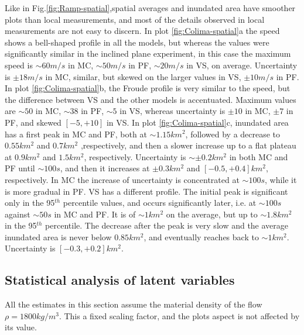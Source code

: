 \documentclass{article}
\begin{document}
Like in Fig.\ref{fig:Ramp-spatial},spatial averages and inundated area have smoother plots than local measurements, and most of the details observed in local measurements are not easy to discern. In plot \ref{fig:Colima-spatial}a the speed shows a bell-shaped profile in all the models, but whereas the values were significantly similar in the inclined plane experiment, in this case the maximum speed is $\sim 60 m/s$ in MC, $\sim 50 m/s$ in PF, $\sim 20 m/s$ in VS, on average. Uncertainty is $\pm 18 m/s$ in MC, similar, but skewed on the larger values in VS, $\pm 10 m/s$ in PF. In plot \ref{fig:Colima-spatial}b, the Froude profile is very similar to the speed, but the difference between VS and the other models is accentuated. Maximum values are $\sim 50$ in MC, $\sim 38$ in PF, $\sim 5$ in VS, whereas uncertainty is $\pm 10$ in MC, $\pm 7$ in PF, and skewed $[-5, +10]$ in VS. In plot \ref{fig:Colima-spatial}c, inundated area has a first peak in MC and PF, both at $\sim 1.15 km^2$, followed by a decrease to $0.55 km^2$ and $0.7 km^2$ ,respectively, and then a slower increase up to a flat plateau at $0.9 km^2$ and $1.5 km^2$, respectively. Uncertainty is $\sim \pm 0.2 km^2$ in both MC and PF until $\sim 100 s$, and then it increases at $\pm 0.3 km^2$ and $[-0.5, +0.4] km^2$, respectively. In MC the increase of uncertainty is concentrated at $\sim 100 s$, while it is more gradual in PF. VS has a different profile. The initial peak is significant only in the 95$^{th}$ percentile values, and occurs significantly later, i.e. at $\sim 100 s$ against $\sim 50 s$ in MC and PF. It is of $\sim 1 km^2$ on the average, but up to $\sim 1.8 km^2$ in the 95$^{th}$ percentile. The decrease after the peak is very slow and the average inundated area is never below $0.85 km^2$, and eventually reaches back to $\sim 1 km^2$. Uncertainty is $[-0.3, +0.2] km^2$.

\subsection{Statistical analysis of latent variables}\label{Hq2}
All the estimates in this section assume the material density of the flow $\rho = 1800 kg/m^3$. This a fixed scaling factor, and the plots aspect is not affected by its value.
\end{document}
